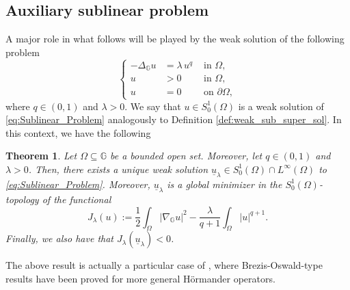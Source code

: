 \documentclass[11pt]{amsart}
\numberwithin{equation}{section} %
\newtheorem{teo}{Theorem}[section]
\theoremstyle{definition}
\begin{document}
\medskip


\subsection{Auxiliary sublinear problem}\label{subsec:Auxiliary}
A major role in what follows will be played by the weak solution of the following problem
%
\begin{equation}\label{eq:Sublinear_Problem}
	\left\{\begin{array}{rll}
				-\Delta_{\mathbb{G}}u &= \lambda\, u^{q} & \textrm{ in } \Omega,\\
				u&>0 & \textrm{ in } \Omega,\\
				u&=0 & \textrm{ on } \partial \Omega,
	\end{array}\right.
\end{equation}
\noindent where $q \in (0,1)$ and $\lambda >0$. We say that $u \in S^{1}_{0}(\Omega)$ is a weak solution of \eqref{eq:Sublinear_Problem} analogously to Definition \ref{def:weak_sub_super_sol}.
In this context, we have the following

\begin{teo}\label{thm:Sublinear_Problem}
	Let $\Omega\subseteq\mathbb{G}$
	be a bounded open set. Moreover, let $q \in (0,1)$ and $\lambda >0$. 
	Then, there exists a unique weak solution $\underline{u}_{\lambda} \in S^{1}_{0}(\Omega) \cap L^{\infty}(\Omega)$ to \eqref{eq:Sublinear_Problem}. Moreover, $\underline{u}_{\lambda}$ is a global minimizer in the $S^{1}_{0}(\Omega)$-topology
	of the functional 
		\begin{equation}\label{eq:def_Functional_Singular}
				J_{\lambda}(u):= \dfrac{1}{2}\int_{\Omega}|\nabla_{\mathbb{G}}u|^{2} 
				-\dfrac{\lambda}{q+1} \int_{\Omega}|u|^{q+1}.
			\end{equation}
		Finally, we also have that $J_{\lambda}(\underline u_\lambda)<0$.
   \end{teo}
The above result is actually a particular case of \cite[Theorem 1.1, Proposition 5.1]{BPV}, where Brezis-Oswald-type results have been proved for more general H\"{o}rmander operators.

\medskip
\end{document}
